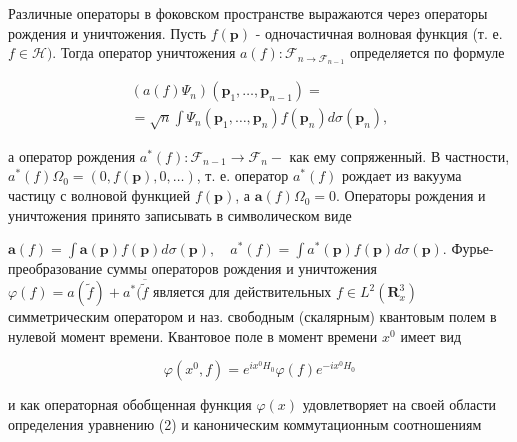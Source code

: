 \documentclass[10pt]{article}
\begin{document}
Различные операторы в фоковском пространстве выражаются через операторы рождения и уничтожения. Пусть $f(\boldsymbol{p})$ - одночастичная волновая функция (т. е. $f \in \mathscr{H})$. Тогда оператор уничтожения $a(f): \mathscr{F}_{n \rightarrow \mathcal{F}_{n-1}}$ определяется по формуле



\[

\begin{gathered}

\left(a(f) \Psi_{n}\right)\left(\boldsymbol{p}_{1}, \ldots, \boldsymbol{p}_{n-1}\right)= \\

=\sqrt{n} \int \Psi_{n}\left(\boldsymbol{p}_{1}, \ldots, \boldsymbol{p}_{n}\right) f\left(\boldsymbol{p}_{n}\right) d \sigma\left(\boldsymbol{p}_{n}\right),

\end{gathered}

\]



а оператор рождения $a^{*}(f): \mathscr{F}_{n-1} \rightarrow \mathscr{F}_{n}-$ как ему сопряженный. В частности, $a^{*}(f) \Omega_{0}=(0, f(\boldsymbol{p}), 0, \ldots)$, т. е. оператор $a^{*}(f)$ рождает из вакуума частицу с волновой функцией $f(\boldsymbol{p})$, а $\boldsymbol{a}(f) \Omega_{0}=0$. Операторы рождения и уничтожения принято записывать в символическом виде



$\boldsymbol{a}(f)=\int \boldsymbol{a}(\boldsymbol{p}) f(\boldsymbol{p}) d \sigma(\boldsymbol{p}), \quad a^{*}(f)=\int a^{*}(\boldsymbol{p}) f(\boldsymbol{p}) d \sigma(\boldsymbol{p})$. Фурье-преобразование суммы операторов рождения и уничтожения $\varphi(f)=a(\tilde{f})+a^{*}(\overline{\tilde{f}}$ является для действительных $f \in L^{2}\left(\boldsymbol{R}_{x}^{3}\right)$ симметрическим оператором и наз. свободным (скалярным) квантовым полем в нулевой момент времени. Квантовое поле в момент времени $x^{0}$ имеет вид



\[

\varphi\left(x^{0}, f\right)=e^{i x^{0} H_{0}} \varphi(f) e^{-i x^{0} H_{0}}

\]



и как операторная обобщенная функция $\varphi(x)$ удовлетворяет на своей области определения уравнению (2) и каноническим коммутационным соотношениям
\end{document}
